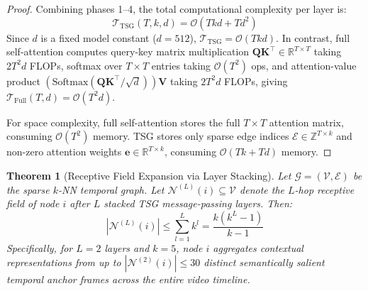 \documentclass[letterpaper]{article}
\newtheorem{theorem}{Theorem}
\begin{document}
\begin{proof}
Combining phases 1--4, the total computational complexity per layer is:
\begin{equation}
\mathcal{T}_{\text{TSG}}(T, k, d) = \mathcal{O}(T k d + T d^2)
\end{equation}
Since $d$ is a fixed model constant ($d=512$), $\mathcal{T}_{\text{TSG}} = \mathcal{O}(T k d)$. In contrast, full self-attention computes query-key matrix multiplication $\mathbf{Q} \mathbf{K}^\top \in \mathbb{R}^{T \times T}$ taking $2 T^2 d$ FLOPs, softmax over $T \times T$ entries taking $\mathcal{O}(T^2)$ ops, and attention-value product $(\text{Softmax}(\mathbf{Q}\mathbf{K}^\top/\sqrt{d}))\mathbf{V}$ taking $2 T^2 d$ FLOPs, giving $\mathcal{T}_{\text{Full}}(T, d) = \mathcal{O}(T^2 d)$.

For space complexity, full self-attention stores the full $T \times T$ attention matrix, consuming $\mathcal{O}(T^2)$ memory. TSG stores only sparse edge indices $\mathcal{E} \in \mathbb{Z}^{T \times k}$ and non-zero attention weights $\mathbf{e} \in \mathbb{R}^{T \times k}$, consuming $\mathcal{O}(T k + T d)$ memory.
\end{proof}

\begin{theorem}[Receptive Field Expansion via Layer Stacking]
\label{thm:receptive_field}
Let $\mathcal{G} = (\mathcal{V}, \mathcal{E})$ be the sparse $k$-NN temporal graph. Let $\mathcal{N}^{(L)}(i) \subseteq \mathcal{V}$ denote the $L$-hop receptive field of node $i$ after $L$ stacked TSG message-passing layers. Then:
\begin{equation}
|\mathcal{N}^{(L)}(i)| \le \sum_{l=1}^L k^l = \frac{k(k^L - 1)}{k - 1}
\end{equation}
Specifically, for $L=2$ layers and $k=5$, node $i$ aggregates contextual representations from up to $|\mathcal{N}^{(2)}(i)| \le 30$ distinct semantically salient temporal anchor frames across the entire video timeline.
\end{theorem}
\end{document}
